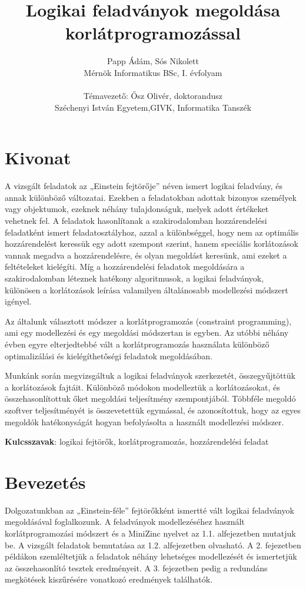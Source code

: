 \documentclass[12pt,a4paper,twoside, openright]{report}
\author{Papp Ádám, Sós Nikolett\\Mérnök Informatikus BSc, I. évfolyam\\\ \\Témavezető: Ősz Olivér, doktorandusz\\Széchenyi István Egyetem,GIVK, Informatika Tanszék}
\title{Logikai feladványok megoldása \\korlátprogramozással}
\begin{document}
\maketitle


    \chapter*{Kivonat}

 A vizsgált feladatok az „Einstein fejtörője” néven ismert logikai feladvány, és annak különböző változatai. Ezekben a feladatokban adottak bizonyos személyek vagy objektumok, ezeknek néhány tulajdonságuk, melyek adott értékeket vehetnek fel. A feladatok hasonlítanak a szakirodalomban hozzárendelési feladatként ismert feladatosztályhoz, azzal a különbséggel, hogy nem az optimális hozzárendelést keressük egy adott szempont szerint, hanem speciális korlátozások vannak megadva a hozzárendelésre, és olyan megoldást keresünk, ami ezeket a feltételeket kielégíti. Míg a hozzárendelési feladatok megoldására a szakirodalomban léteznek hatékony algoritmusok, a logikai feladványok, különösen a korlátozások leírása valamilyen általánosabb modellezési módszert igényel.

Az általunk választott módszer a korlátprogramozás (constraint programming), ami egy modellezési és egy megoldási módszertan is egyben. Az utóbbi néhány évben egyre elterjedtebbé vált a korlátprogramozás használata különböző optimalizálási és kielégíthetőségi feladatok megoldásában.

Munkánk során megvizsgáltuk a logikai feladványok szerkezetét, összegyűjtöttük a korlátozások fajtáit. Különböző módokon modelleztük a korlátozásokat, és összehasonlítottuk őket megoldási teljesítmény szempontjából. Többféle megoldó szoftver teljesítményét is összevetettük egymással, és azonosítottuk, hogy az egyes megoldók hatékonyságát hogyan befolyásolta a használt modellezési módszer.

\textbf{Kulcsszavak}: logikai fejtörők, korlátprogramozás, hozzárendelési feladat




\tableofcontents

\chapter{Bevezetés} 
	Dolgozatunkban az „Einstein-féle” fejtörőkként ismertté vált logikai feladványok megoldásával foglalkozunk. A feladványok modellezéséhez használt korlátprogramozási módszert és a MiniZinc nyelvet az 1.1. alfejezetben mutatjuk be. A vizsgált feladatok bemutatása az 1.2. alfejezetben olvasható. A 2. fejezetben példákon szemléltetjük a feladatok néhány lehetséges modellezését és ismertetjük az összehasonlító tesztek eredményeit. A 3. fejezetben pedig a redundáns megkötések kiszűrésére vonatkozó eredmények találhatók.
\end{document}
